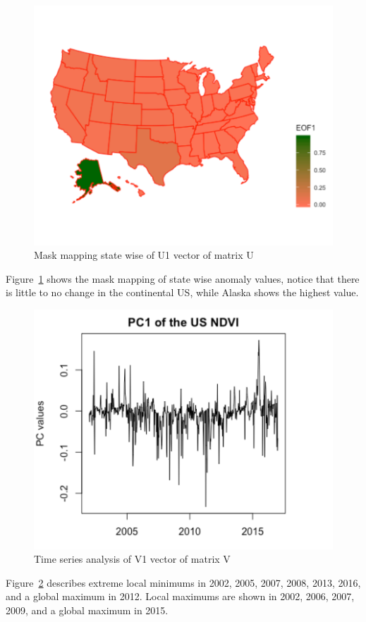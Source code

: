      \begin{figure}[H]
            \centering
            \includegraphics[width=0.70\linewidth]{figures/ch5/SVD/eof1.png}
            \caption{\label{fig:EOF_1} Mask mapping state wise of U1 vector of matrix U}
    \end{figure}
    
    Figure~\ref{fig:EOF_1} shows the mask mapping of state wise anomaly values, notice that there is little to no change in the continental US, while Alaska shows the highest value.
    
     \begin{figure}[H]
            \centering
            \includegraphics[width=0.70\linewidth]{figures/ch5/SVD/pc1.png}
            \caption{\label{fig:V_1} Time series analysis of V1 vector of matrix V}
    \end{figure}
    
    Figure~\ref{fig:V_1} describes extreme local minimums in 2002, 2005, 2007, 2008, 2013, 2016, and a global maximum in 2012. Local maximums are shown in 2002, 2006, 2007, 2009, and a global maximum in 2015. 
    
